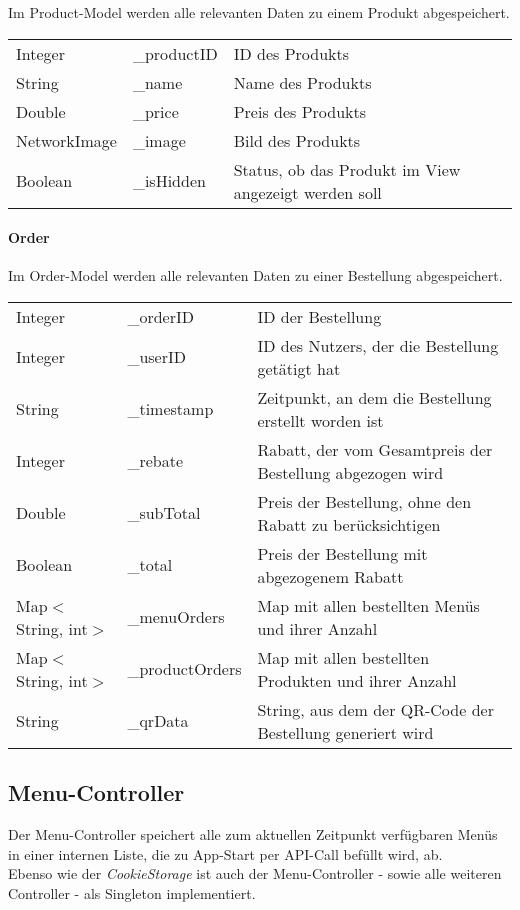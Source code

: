 Im Product-Model werden alle relevanten Daten zu einem Produkt abgespeichert.

\begin{tabular}{l l l}
    Integer & \_productID & ID des Produkts\\
    String & \_name & Name des Produkts\\
    Double & \_price & Preis des Produkts\\
    NetworkImage & \_image & Bild des Produkts\\
    Boolean & \_isHidden & Status, ob das Produkt im View angezeigt werden soll
\end{tabular}
\pagebreak
\paragraph{Order}
\label{clientordermodel}

Im Order-Model werden alle relevanten Daten zu einer Bestellung abgespeichert.

\begin{tabular}{l l l}
    Integer & \_orderID & ID der Bestellung\\
    Integer & \_userID & ID des Nutzers, der die Bestellung getätigt hat\\
    String & \_timestamp & Zeitpunkt, an dem die Bestellung erstellt worden ist\\
    Integer & \_rebate & Rabatt, der vom Gesamtpreis der Bestellung abgezogen wird\\
    Double & \_subTotal & Preis der Bestellung, ohne den Rabatt zu berücksichtigen\\
    Boolean & \_total & Preis der Bestellung mit abgezogenem Rabatt\\
    Map$<$String, int$>$ & \_menuOrders & Map mit allen bestellten Menüs und ihrer Anzahl\\
    Map$<$String, int$>$ & \_productOrders & Map mit allen bestellten Produkten und ihrer Anzahl\\
    String & \_qrData & String, aus dem der QR-Code der Bestellung generiert wird\\
\end{tabular}

\subsection{Menu-Controller}

Der Menu-Controller speichert alle zum aktuellen Zeitpunkt verfügbaren Menüs in einer internen Liste,
die zu App-Start per API-Call befüllt wird, ab.\\
Ebenso wie der \textit{CookieStorage} ist auch der Menu-Controller - sowie alle weiteren Controller -
als Singleton implementiert.

